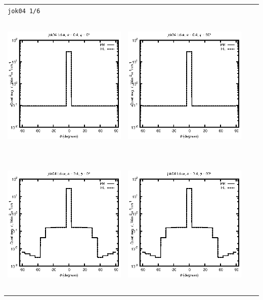 \begin{tabular}{c c c c}
\multicolumn{4}{l}{\texttt{jok04 1/6}} \\
\includegraphics[height=7cm]{../eps/jok04_Ld_a_fwd.eps} &
\includegraphics[height=7cm]{../eps/jok04_Ld_a_cross.eps}\\
\includegraphics[height=7cm]{../eps/jok04_Ld_w_fwd.eps} &
\includegraphics[height=7cm]{../eps/jok04_Ld_w_cross.eps} \\

\end{tabular}
